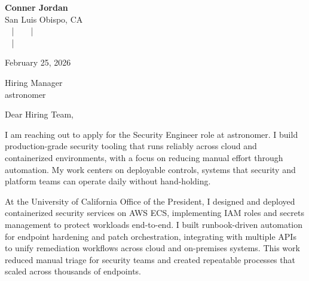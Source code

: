 \documentclass[letterpaper,11pt]{article}
\newcommand{\companyname}{astronomer}
\begin{document}
\begin{center}
  {\Huge \textbf{Conner Jordan}}\\[4pt]
  {\Large San Luis Obispo, CA}\\[4pt]
  \href{tel:+18059759793}{
    } ~ | ~
  \href{mailto:connercharlesjordan@gmail.com}{
    } ~ | ~
   \\
  \href{https://www.linkedin.com/in/conner-jordan-4b268514a/}{
    } ~ | ~
  \href{https://github.com/cjordan223}{
    }
\end{center}

\vspace{16pt}

\begin{flushright}
February 25, 2026
\end{flushright}

Hiring Manager\\
\companyname

\vspace{26pt}

\noindent
Dear Hiring Team,

\vspace{16pt}

I am reaching out to apply for the Security Engineer role at astronomer. I build production-grade security tooling that runs reliably across cloud and containerized environments, with a focus on reducing manual effort through automation. My work centers on deployable controls, systems that security and platform teams can operate daily without hand-holding.

\vspace{16pt}

At the University of California Office of the President, I designed and deployed containerized security services on AWS ECS, implementing IAM roles and secrets management to protect workloads end-to-end. I built runbook-driven automation for endpoint hardening and patch orchestration, integrating with multiple APIs to unify remediation workflows across cloud and on-premises systems. This work reduced manual triage for security teams and created repeatable processes that scaled across thousands of endpoints.
\end{document}
